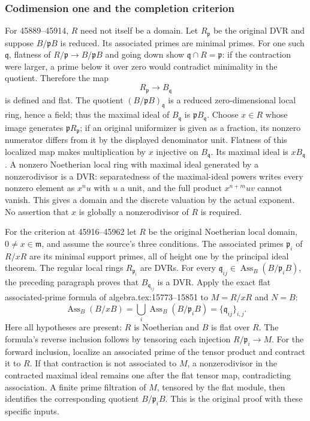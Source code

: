 \subsubsection{Codimension one and the completion criterion}\label{codimension-one-and-the-completion-criterion}

For 45889--45914, \(R\) need not itself be a domain. Let \(R_{\mathfrak p}\) be the original DVR and suppose \(B/\mathfrak pB\) is reduced. Its associated primes are minimal primes. For one such \(\mathfrak q\), flatness of \(R/\mathfrak p\to B/\mathfrak pB\) and going down show \(\mathfrak q\cap R=\mathfrak p\): if the contraction were larger, a prime below it over zero would contradict minimality in the quotient. Therefore the map \[
 R_{\mathfrak p}\longrightarrow B_{\mathfrak q}
\] is defined and flat. The quotient \((B/\mathfrak pB)_{\mathfrak q}\) is a reduced zero-dimensional local ring, hence a field; thus the maximal ideal of \(B_{\mathfrak q}\) is \(\mathfrak pB_{\mathfrak q}\). Choose \(x\in R\) whose image generates \(\mathfrak pR_{\mathfrak p}\); if an original uniformizer is given as a fraction, its nonzero numerator differs from it by the displayed denominator unit. Flatness of this localized map makes multiplication by \(x\) injective on \(B_{\mathfrak q}\). Its maximal ideal is \(xB_{\mathfrak q}\). A nonzero Noetherian local ring with maximal ideal generated by a nonzerodivisor is a DVR: separatedness of the maximal-ideal powers writes every nonzero element as \(x^n u\) with \(u\) a unit, and the full product \(x^{n+m}uv\) cannot vanish. This gives a domain and the discrete valuation by the actual exponent. No assertion that \(x\) is globally a nonzerodivisor of \(R\) is required.

For the criterion at 45916--45962 let \(R\) be the original Noetherian local domain, \(0\ne x\in\mathfrak m\), and assume the source's three conditions. The associated primes \(\mathfrak p_i\) of \(R/xR\) are its minimal support primes, all of height one by the principal ideal theorem. The regular local rings \(R_{\mathfrak p_i}\) are DVRs. For every \(\mathfrak q_{ij}\in\operatorname{Ass}_B(B/\mathfrak p_iB)\), the preceding paragraph proves that \(B_{\mathfrak q_{ij}}\) is a DVR. Apply the exact flat associated-prime formula of algebra.tex:15773--15851 to \(M=R/xR\) and \(N=B\): \[
 \operatorname{Ass}_B(B/xB)
 =\bigcup_i\operatorname{Ass}_B(B/\mathfrak p_iB)
 =\{\mathfrak q_{ij}\}_{i,j}.
\] Here all hypotheses are present: \(R\) is Noetherian and \(B\) is flat over \(R\). The formula's reverse inclusion follows by tensoring each injection \(R/\mathfrak p_i\to M\). For the forward inclusion, localize an associated prime of the tensor product and contract it to \(R\). If that contraction is not associated to \(M\), a nonzerodivisor in the contracted maximal ideal remains one after the flat tensor map, contradicting association. A finite prime filtration of \(M\), tensored by the flat module, then identifies the corresponding quotient \(B/\mathfrak p_iB\). This is the original proof with these specific inputs.

